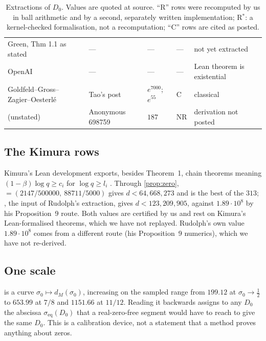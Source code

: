 \documentclass[11pt]{article}
\theoremstyle{definition}
\begin{document}
\begin{table}[ht]
\begin{tabular}{@{}p{3.7cm}p{3.6cm}p{2.6cm}p{0.6cm}p{4.2cm}@{}}
Green, Thm 1.1 as stated \cite{Green2026} & --- & --- & --- & not yet extracted\\
OpenAI \cite{OAIsiegel} & --- & --- & --- & Lean theorem is existential\\
Goldfeld--Gross--Zagier--Oesterl\'e & Tao's post & $e^{7000}$; $e^{55}$ & C & classical\\
(unstated) & Anonymous 698759 & $187$ & NR & derivation not posted\\\bottomrule
\end{tabular}
\caption{Extractions of $D_0$. Values are quoted at source. ``R'' rows were recomputed by us in ball arithmetic and by a second, separately written implementation; R$^*$: a kernel-checked formalisation, not a recomputation; ``C'' rows are cited as posted.}\label{tab:survey}
\end{table}

\subsection{The Kimura rows}
Kimura's Lean development exports, besides Theorem~1, chain theorems  meaning $(1-\beta)\log q \ge c_i$ for $\log q \ge l_i$ \cite{Kimura2026}. Through \cref{prop:zero},  $= (2147/500000,\ 88711/5000)$ gives $d < 64{,}668{,}273$ and is the best of the $313$; , the input of Rudolph's extraction, gives $d < 123{,}209{,}905$, against $1.89\cdot10^8$ by his Proposition~9 route. Both values are certified by us and rest on Kimura's Lean-formalised theorems, which we have not replayed. Rudolph's own value $1.89\cdot10^8$ comes from a different route (his Proposition~9 numerics), which we have not re-derived.

\subsection{One scale}\label{sec:scale}
 is a curve $\sigma_0 \mapsto d_M(\sigma_0)$, increasing on the sampled range from $199.12$ at $\sigma_0 \to \frac12$ to $653.99$ at $7/8$ and $1151.66$ at $11/12$. Reading it backwards assigns to any $D_0$ the abscissa $\sigma_{\mathrm{eq}}(D_0)$ that a real-zero-free segment would have to reach to give the same $D_0$. This is a calibration device, not a statement that a method proves anything about zeros.
\end{document}
